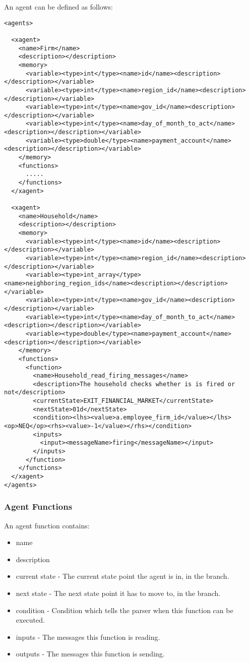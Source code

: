 An agent can be defined as follows:
\begin{mylisting}
\begin{verbatim}
<agents>

  <xagent>
    <name>Firm</name>
    <description></description>
    <memory>
      <variable><type>int</type><name>id</name><description></description></variable>
      <variable><type>int</type><name>region_id</name><description></description></variable>
      <variable><type>int</type><name>gov_id</name><description></description></variable>
      <variable><type>int</type><name>day_of_month_to_act</name><description></description></variable>
      <variable><type>double</type><name>payment_account</name><description></description></variable>
    </memory>
    <functions>
      .....
    </functions>
  </xagent>

  <xagent>
    <name>Household</name>
    <description></description>
    <memory>
      <variable><type>int</type><name>id</name><description></description></variable>
      <variable><type>int</type><name>region_id</name><description></description></variable>
      <variable><type>int_array</type><name>neighboring_region_ids</name><description></description></variable>
      <variable><type>int</type><name>gov_id</name><description></description></variable>
      <variable><type>int</type><name>day_of_month_to_act</name><description></description></variable>
      <variable><type>double</type><name>payment_account</name><description></description></variable>
    </memory>
    <functions>
      <function>
        <name>Household_read_firing_messages</name>
        <description>The household checks whether is is fired or not</description>
        <currentState>EXIT_FINANCIAL_MARKET</currentState>
        <nextState>01d</nextState>
        <condition><lhs><value>a.employee_firm_id</value></lhs><op>NEQ</op><rhs><value>-1</value></rhs></condition>
        <inputs>
          <input><messageName>firing</messageName></input>
        </inputs>
      </function>
    </functions>
  </xagent>
</agents>
\end{verbatim}
\end{mylisting}

\subsubsection{Agent Functions}
An agent function contains:
\begin{itemize}
\item name
\item description
\item current state - The current state point the agent is in, in
the branch.
\item next state - The next state point it has to move to, in the
branch.
\item condition - Condition which tells the parser when this
function can be executed.
\item inputs - The messages this function is reading.
\item outputs - The messages this function is sending.
\end{itemize}

